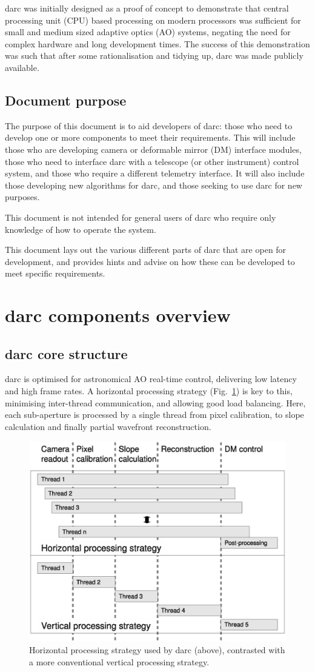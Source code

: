 \documentclass[a4,10pt]{article}
\newcommand{\ao}{adaptive optics (AO)\renewcommand{\ao}{AO\xspace}\xspace}
\newcommand{\cpu}{central processing unit
  (CPU)\renewcommand{\cpu}{CPU\xspace}\xspace}
\newcommand{\dm}{deformable mirror (DM)\renewcommand{\dm}{DM\xspace}\xspace}
\begin{document}
darc was initially designed as a proof of concept to demonstrate that
\cpu based processing on modern processors was sufficient for small
and medium sized \ao systems, negating the need for complex hardware
and long development times.  The success of this demonstration was
such that after some rationalisation and tidying up, darc was made
publicly available.

\subsection{Document purpose}
The purpose of this document is to aid developers of darc:  those who
need to develop one or more components to meet their requirements.
This will include those who are developing camera or \dm interface
modules, those who need to interface darc with a telescope (or other
instrument) control system, and those who require a different
telemetry interface.  It will also include those developing new
algorithms for darc, and those seeking to use darc for new purposes.

This document is not intended for general users of darc who require
only knowledge of how to operate the system.

This document lays out the various different parts of darc that are
open for development, and provides hints and advise on how these can
be developed to meet specific requirements.

\section{darc components overview}
\subsection{darc core structure}
darc is optimised for astronomical \ao real-time control, delivering
low latency and high frame rates.  A horizontal processing strategy
(Fig.~\ref{fig:horiz}) is key to this, minimising inter-thread
communication, and allowing good load balancing.  Here, each
sub-aperture is processed by a single thread from pixel calibration,
to slope calculation and finally partial wavefront reconstruction.  

\begin{figure}
\includegraphics[width=0.5\linewidth]{processingStrategy.eps}
\caption{Horizontal processing strategy used by
  darc (above), contrasted with a more conventional vertical
  processing strategy.}
\label{fig:horiz}
\end{figure}
\end{document}

